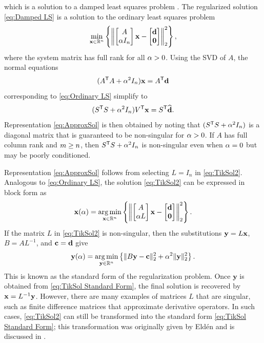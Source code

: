 \documentclass[12pt]{article}
\begin{document}
which is a solution to a damped least squares problem \cite{ABT}. The regularized solution \eqref{eq:Damped LS} is a solution to the ordinary least squares problem
\begin{equation}
\label{eq:Ordinary LS}
\min_{\mathbf{x} \in \mathbb{R}^n} \left\{\left\|
\begin{bmatrix}
A \\
\alpha I_n
\end{bmatrix}\mathbf{x} - 
\begin{bmatrix}
\mathbf{d} \\
\bm{0}
\end{bmatrix}
\right\|_2^2\right\},
\end{equation}
where the system matrix has full rank for all $\alpha > 0$. Using the SVD of $A$, the normal equations 
\[({A}^\mathsf{T}A + \alpha^2 I_n)\mathbf{x} = {A}^\mathsf{T}\mathbf{d}\]
corresponding to \eqref{eq:Ordinary LS} simplify to
\[({S}^\mathsf{T}S + \alpha^2 I_n){V}^\mathsf{T}\mathbf{x} = {S}^\mathsf{T}\widehat{\mathbf{d}}.\]
Representation \eqref{eq:ApproxSol} is then obtained by noting that $({S}^\mathsf{T}S + \alpha^2 I_n)$ is a diagonal matrix that is guaranteed to be non-singular for $\alpha > 0$. If $A$ has full column rank and $m \geq n$, then ${S}^\mathsf{T}S + \alpha^2 I_n$ is non-singular even when $\alpha = 0$ but may be poorly conditioned. \par
Representation \eqref{eq:ApproxSol} follows from selecting $L = I_n$ in \eqref{eq:TikSol2}. Analogous to \eqref{eq:Ordinary LS}, the solution \eqref{eq:TikSol2} can be expressed in block form as
\begin{equation}
\mathbf{x}(\alpha) = \operatorname*{arg\,min}_{\mathbf{x} \in \mathbb{R}^n} \left\{\left\| \begin{bmatrix}
A \\
\alpha L
\end{bmatrix}\mathbf{x} - \begin{bmatrix}
\mathbf{d} \\
\bm{0}
\end{bmatrix} \right\|_2^2\right\}.
\label{eq:TikSol3}
\end{equation}
If the matrix $L$ in \eqref{eq:TikSol2} is non-singular, then the substitutions $\mathbf{y} = L\mathbf{x}$, $B = A{L}^{-1}$, and $\mathbf{c} = \mathbf{d}$ give
\begin{equation}
\mathbf{y}(\alpha) = \operatorname*{arg\,min}_{\mathbf{y} \in \mathbb{R}^n} \left\{\|B\mathbf{y} - \mathbf{c}\|_2^2 + \alpha^2\|\mathbf{y}\|_2^2\right\}.
\label{eq:TikSol Standard Form}
\end{equation}
This is known as the standard form of the regularization problem. Once $\mathbf{y}$ is obtained from \eqref{eq:TikSol Standard Form}, the final solution is recovered by $\mathbf{x} = L^{-1}\mathbf{y}$.  However, there are many examples of matrices $L$ that are singular, such as finite difference matrices that approximate derivative operators. In such cases, \eqref{eq:TikSol2} can still be transformed into the standard form \eqref{eq:TikSol Standard Form}; this transformation was originally given by Eld\'{e}n \cite{Elden} and is discussed in \cite{Hansen:98}.
\end{document}
